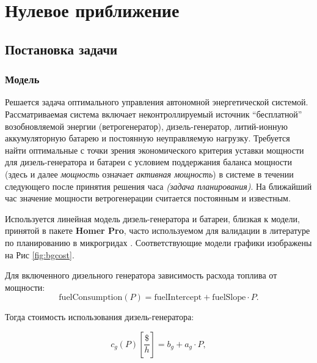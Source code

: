 \documentclass{report}
\begin{document}

\newpage
\chapter{Нулевое приближение}

\section{Постановка задачи}
\label{sec:planning_problem}
\subsection{Модель}

Решается задача оптимального управления автономной энергетической системой.\\
Рассматриваемая система включает неконтроллируемый источник ``бесплатной'' возобновляемой энергии  (ветрогенератор), дизель-генератор, литий-ионную аккумуляторную батарею и постоянную неуправляемую нагрузку.
Требуется найти оптимальные с точки зрения экономического критерия уставки мощности для дизель-генератора и батареи с условием поддержания баланса мощности (здесь и далее \textit{мощность} означает \textit{активная мощность}) в системе в течении следующего после принятия решения часа \textit{(задача планирования)}.
На ближайший час значение мощности ветрогенерации считается постоянным и известным.

Используется линейная модель дизель-генератора и батареи, близкая к модели, принятой в пакете \textbf{Homer Pro}, часто используемом для валидации в литературе по планированию в микрогридах \cite{Berendes2018, Aziz2019, Petersen2018, Olatomiwa2016}. 
Соответствующие модели графики изображены на Рис \ref{fig:bgcost}.

Для включенного дизельного генератора зависимость расхода топлива от мощности:
\begin{equation}
 \text{fuelConsumption} (P) = \text{fuelIntercept} + \text{fuelSlope} \cdot P.
\end{equation}

Тогда стоимость использования дизель-генератора:

\begin{equation}\label{f:cg}
c_g(P) \left[\frac{\$}{h} \right] = b_g + a_g \cdot P,
\end{equation}
\end{document}
